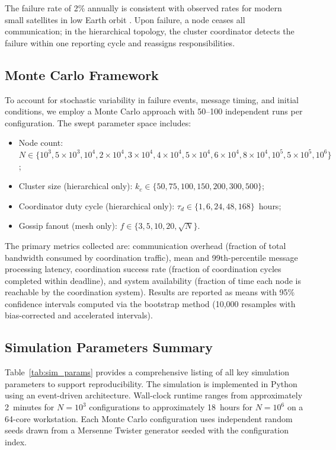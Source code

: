 \documentclass[journal]{IEEEtran}
\begin{document}
The failure rate of 2\% annually is consistent with observed rates for modern small satellites in low Earth orbit \cite{castet_smallsat_reliability}. Upon failure, a node ceases all communication; in the hierarchical topology, the cluster coordinator detects the failure within one reporting cycle and reassigns responsibilities.

\subsection{Monte Carlo Framework}

To account for stochastic variability in failure events, message timing, and initial conditions, we employ a Monte Carlo approach with 50--100 independent runs per configuration. The swept parameter space includes:

\begin{itemize}
    \item Node count: $N \in \{10^3, 5 \times 10^3, 10^4, 2 \times 10^4, 3 \times 10^4, 4 \times 10^4, 5 \times 10^4, 6 \times 10^4, 8 \times 10^4, 10^5, 5 \times 10^5, 10^6\}$;
    \item Cluster size (hierarchical only): $k_c \in \{50, 75, 100, 150, 200, 300, 500\}$;
    \item Coordinator duty cycle (hierarchical only): $\tau_d \in \{1, 6, 24, 48, 168\}$~hours;
    \item Gossip fanout (mesh only): $f \in \{3, 5, 10, 20, \sqrt{N}\}$.
\end{itemize}

The primary metrics collected are: communication overhead (fraction of total bandwidth consumed by coordination traffic), mean and 99th-percentile message processing latency, coordination success rate (fraction of coordination cycles completed within deadline), and system availability (fraction of time each node is reachable by the coordination system). Results are reported as means with 95\% confidence intervals computed via the bootstrap method (10{,}000 resamples with bias-corrected and accelerated intervals).

\subsection{Simulation Parameters Summary}

Table~\ref{tab:sim_params} provides a comprehensive listing of all key simulation parameters to support reproducibility. The simulation is implemented in Python using an event-driven architecture. Wall-clock runtime ranges from approximately 2~minutes for $N = 10^3$ configurations to approximately 18~hours for $N = 10^6$ on a 64-core workstation. Each Monte Carlo configuration uses independent random seeds drawn from a Mersenne Twister generator seeded with the configuration index.
\end{document}
